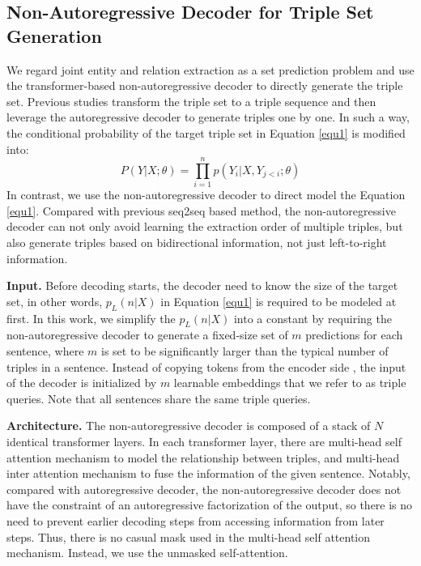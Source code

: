 \documentclass[letterpaper]{article} \usepackage{aaai21}  \usepackage{times}  \usepackage{helvet} \usepackage{courier}  \usepackage[hyphens]{url}  \usepackage{graphicx} \usepackage{amsfonts,amssymb}
\begin{document}
\subsection{Non-Autoregressive Decoder for Triple Set Generation}
\label{decoder}
We regard joint entity and relation extraction as a set prediction problem and use the transformer-based non-autoregressive decoder \cite{gu2018non} to directly generate the triple set. Previous studies \cite{zeng2018extracting, zeng2019learning,nayak2019ptrnetdecoding,zeng2020copymtl} transform the triple set to a triple sequence and then leverage the autoregressive decoder to generate triples one by one. In such a way, the conditional probability of the target triple set in Equation \ref{equ1} is modified into:
\begin{equation}
        P(Y|X;\theta) =\prod \limits_{i=1}^n p(Y_i|X, Y_{j < i}; \theta)
\end{equation}
In contrast, we use the non-autoregressive decoder to direct model the Equation \ref{equ1}. Compared with previous seq2seq based method, the non-autoregressive decoder can not only 
avoid learning the extraction order of multiple triples, but also generate triples based on bidirectional information, not just left-to-right information.

\textbf{Input.} Before decoding starts, the decoder need to know  the size of  the target set, in other words, $p_L(n|X)$ in Equation \ref{equ1} is required to be modeled at first. In this work, we simplify the $p_L(n|X)$ into a constant by requiring the non-autoregressive decoder to generate a fixed-size set of $m$ predictions for each sentence,  where $m$ is set to be significantly larger than the typical number of triples in a sentence.  Instead of copying tokens from the encoder side \cite{gu2018non}, the input of the decoder is initialized by $m$ learnable embeddings that we refer to as triple queries. Note that all sentences share the same triple queries.

\textbf{Architecture.} The non-autoregressive decoder is composed of a stack of $N$ identical transformer layers. In each transformer layer, there are multi-head self attention mechanism to model the relationship between triples, and multi-head inter attention mechanism to fuse the information of the given sentence. Notably, compared with autoregressive decoder, the non-autoregressive decoder does not have the constraint of an autoregressive factorization of the output, so there is no need to prevent earlier decoding steps from accessing information from later steps. Thus, there is no casual mask used in the multi-head self attention mechanism. Instead, we use the unmasked self-attention.
\end{document}
